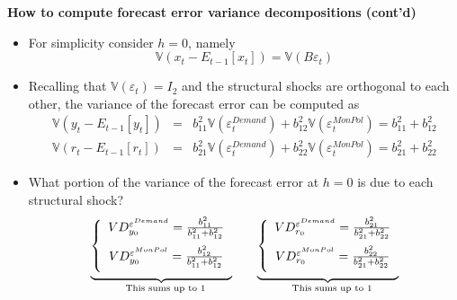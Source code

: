 \begin{frame}
{\textbf{How to compute forecast error variance decompositions (cont'd)}}%
\vspace{-.15cm}

\begin{itemize}
\item For simplicity consider $h=0$, namely%
\begin{equation*}
\mathbb{V}\left( x_{t}-E_{t-1}[x_{t}]\right) =\mathbb{V}\left( B\varepsilon
_{t}\right)
\end{equation*}%
\vspace{-.1cm}

\item Recalling that $\mathbb{V}\left( \varepsilon _{t}\right) =I_{2}$ and
the structural shocks are orthogonal to each other, the variance of the
forecast error can be computed as%
\begin{eqnarray*}
\mathbb{V}\left( y_{t}-E_{t-1}[y_{t}]\right) &=&b_{11}^{2}\mathbb{V}\left(
\varepsilon _{t}^{Demand}\right) +b_{12}^{2}\mathbb{V}\left( \varepsilon
_{t}^{MonPol}\right) =b_{11}^{2}+b_{12}^{2} \\
\mathbb{V}\left( r_{t}-E_{t-1}[r_{t}]\right) &=&b_{21}^{2}\mathbb{V}\left(
\varepsilon _{t}^{Demand}\right) +b_{22}^{2}\mathbb{V}\left( \varepsilon
_{t}^{MonPol}\right) =b_{21}^{2}+b_{22}^{2}
\end{eqnarray*}%
\vspace{-.1cm}

\item What portion of the variance of the forecast error at $h=0$ is due to
each structural shock? 
\begin{equation*}
\underset{\text{This sums up to 1}}{\underbrace{\left\{ 
\begin{array}{c}
VD_{y_{0}}^{\varepsilon ^{Demand}}=\frac{b_{11}^{2}}{b_{11}^{2}+b_{12}^{2}}%
\medskip \\ 
VD_{y_{0}}^{\varepsilon ^{MonPol}}=\frac{b_{12}^{2}}{b_{11}^{2}+b_{12}^{2}}%
\medskip%
\end{array}%
\right. }}\ \ \ \ \ \ \underset{\text{This sums up to 1}}{\underbrace{%
\left\{ 
\begin{array}{c}
VD_{r_{0}}^{\varepsilon ^{Demand}}=\frac{b_{21}^{2}}{b_{21}^{2}+b_{22}^{2}}%
\medskip \\ 
VD_{r_{0}}^{\varepsilon ^{MonPol}}=\frac{b_{22}^{2}}{b_{21}^{2}+b_{22}^{2}}%
\medskip%
\end{array}%
\right. }}
\end{equation*}
\end{itemize}
\end{frame}

